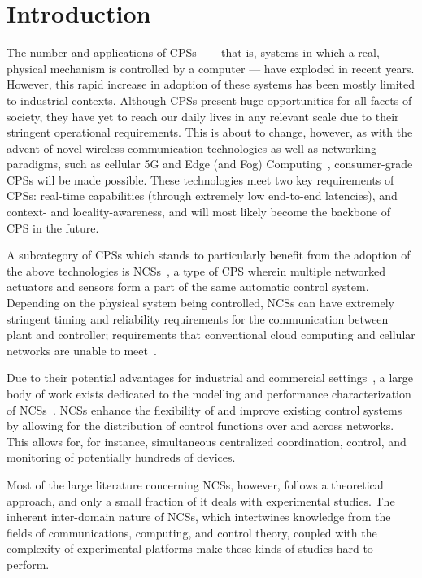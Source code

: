 \section{Introduction}\label{sec:intro}

The number and applications of \acp{CPS}~\cite{Rajkumar2010CPS} --- that is, systems in which a real, physical mechanism is controlled by a computer --- have exploded in recent years.
However, this rapid increase in adoption of these systems has been mostly limited to industrial contexts.
Although \acp{CPS} present huge opportunities for all facets of society, they have yet to reach our daily lives in any relevant scale due to their stringent operational requirements.
This is about to change, however, as with the advent of novel wireless communication technologies as well as networking paradigms, such as cellular 5G and Edge (and Fog) Computing~\cite{Satya2009Case,Satya2017Emergence}, consumer-grade \acp{CPS} will be made possible.
These technologies meet two key requirements of \acp{CPS}: real-time capabilities (through extremely low end-to-end latencies), and context- and locality-awareness, and will most likely become the backbone of \ac{CPS} in the future.

A subcategory of \acp{CPS} which stands to particularly benefit from the adoption of the above technologies is \acp{NCS}~\cite{Gupta2010NCSOverview}, a type of \ac{CPS} wherein multiple networked actuators and sensors form a part of the same automatic control system.
Depending on the physical system being controlled, \acp{NCS} can have extremely stringent timing and reliability requirements for the communication between plant and controller; requirements that conventional cloud computing and cellular networks are unable to meet~\cite{Liu2017Review,Wan2020Efficient}.

Due to their potential advantages for industrial and commercial settings~\cite{Lu2015WSAN}, a large body of work exists dedicated to the modelling and performance characterization of \aclp{NCS}~\cite{Hespanha2007Survey,Zhang2013Survey,Zhang2016Survey}.
\Acp{NCS} enhance the flexibility of and improve existing control systems by allowing for the distribution of control functions over and across networks.
This allows for, for instance, simultaneous centralized coordination, control, and monitoring of potentially hundreds of devices.

Most of the large literature concerning \acp{NCS}, however, follows a theoretical approach, and only a small fraction of it deals with experimental studies.
The inherent inter-domain nature of \acp{NCS}, which intertwines knowledge from the fields of communications, computing, and control theory, coupled with the complexity of experimental platforms make these kinds of studies hard to perform.


